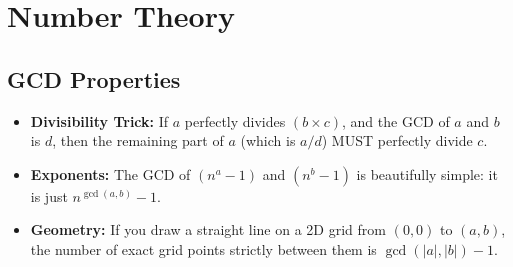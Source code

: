 \section{Number Theory}
\subsection{GCD Properties}
\begin{itemize}\setlength{\itemsep}{1pt}\setlength{\parskip}{0pt}\setlength{\parsep}{0pt}
  \item \textbf{Divisibility Trick:} If $a$ perfectly divides $(b \times c)$, and the GCD of $a$ and $b$ is $d$, then the remaining part of $a$ (which is $a/d$) MUST perfectly divide $c$.
  \item \textbf{Exponents:} The GCD of $(n^a - 1)$ and $(n^b - 1)$ is beautifully simple: it is just $n^{\gcd(a,b)} - 1$.
  \item \textbf{Geometry:} If you draw a straight line on a 2D grid from $(0,0)$ to $(a,b)$, the number of exact grid points strictly between them is $\gcd(|a|, |b|) - 1$.
\end{itemize}

